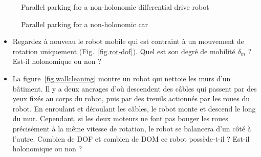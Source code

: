 {\begin{figure}
\begin{minipage}{.45\textwidth}
\caption{Parallel parking for a non-holonomic differential drive robot}\label{fig.parallel-diff}
\end{minipage}
\hspace{\fill}
\begin{minipage}{.45\textwidth}
\caption{Parallel parking for a non-holonomic car}\label{fig.parallel-car}
\end{minipage}
\end{figure}

\begin{framed}
\begin{itemize}
\item Regardez à nouveau le robot mobile qui est contraint à un mouvement de rotation uniquement (Fig.~\ref{fig.rot-dof}). Quel est son degré de mobilité $\delta_m$ ? Est-il holonomique ou non ?
\item La figure~\ref{fig.wallcleaning} montre un robot qui nettoie les murs d'un bâtiment. Il y a deux ancrages d'où descendent des câbles qui passent par des yeux fixés au corps du robot, puis par des treuils actionnés par les roues du robot. En enroulant et déroulant les câbles, le robot monte et descend le long du mur. Cependant, si les deux moteurs ne font pas bouger les roues précisément à la même vitesse de rotation, le robot se balancera d'un côté à l'autre. Combien de DOF et combien de DOM ce robot possède-t-il ? Est-il holonomique ou non ?
\end{itemize}
\end{framed}


}
